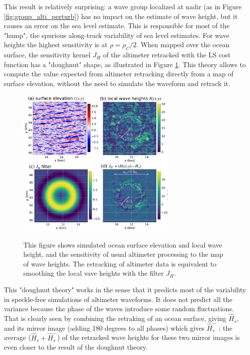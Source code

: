 This result is relatively surprising: a wave group localized at nadir (as in Figure \ref{fig:group_alti_perturb}) has no impact on the estimate of wave height, but it causes an error on the sea level estimate. This is responsible for most of the "hump", the spurious  along-track variability of sea level estimates. For wave heights the highest sensitivity is at $\rho=\rho_C/2$. When mapped over the ocean surface, the sensitivity kernel $J_H$ of the altimeter retracked with the LS cost function has a "doughnut" shape, as illustrated in Figure \ref{fig:alti_doughnut}. This theory allows to compute the value expected from altimeter retracking directly from a map of surface elevation, without the need to simulate the waveform and retrack it. 
\begin{figure}[h!]
\centerline{\includegraphics[width=0.7\textwidth]{FIGS_CH_SAT/doughnut-footprint-for-altimeters.png}}
  \caption{This figure shows simulated ocean surface elevation and local wave height, and the sensitivity of usual altimeter processing to the map of wave heights. The retracking of altimeter data is equivalent to smoothing the local vave heights with the filter $J_H$.}{} \label{fig:alti_doughnut}
\end{figure}
This "doughnut theory" works in the sense that it predicts most of the variability in speckle-free simulations of altimeter waveforms. It does not predict all the variance because the phase of the waves introduce some random fluctuations. That is clearly seen by combining the retraking of an ocean surface, giving $\widehat{H}_s$,  and its mirror image (adding 180 degrees to all phases) which gives $\widehat{H}_s^-$ : the average ($\widehat{H}_s+\widehat{H}_s^-$) of the retracked wave heights for these two mirror images is even closer to the result of the doughnut theory. 
